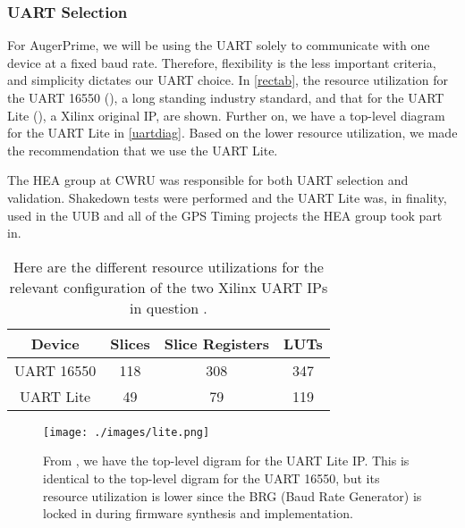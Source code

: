 \subsubsection{UART Selection}
For AugerPrime, we will be using the UART solely to communicate with one device at a fixed baud rate. Therefore, flexibility is the less important criteria, and simplicity dictates our UART choice. In \autoref{rectab}, the resource utilization for the UART 16550 (\cite{16550}), a long standing industry standard, and that for the UART Lite (\cite{lite}), a Xilinx original IP, are shown. Further on, we have a top-level diagram for the UART Lite in \autoref{uartdiag}. Based on the lower resource utilization, we made the recommendation that we use the UART Lite. 

The HEA group at CWRU was responsible for both UART selection and validation. Shakedown tests were performed and the UART Lite was, in finality, used in the UUB and all of the GPS Timing projects the HEA group took part in.
\begin{table}[h!]
\centering
\begin{tabular}{|c|c|c|c|} \hline
Device & Slices & Slice Registers & LUTs \\ \hline
UART 16550 & 118 & 308 & 347  \\ \hline
UART Lite & 49 & 79 &119  \\ \hline
\end{tabular}
\caption[FPGA UART Utilization Comparison]{Here are the different resource utilizations for the relevant configuration of the two Xilinx UART IPs in question \cite{lite, 16550}.}
\label{rectab}
\end{table}

\begin{figure}[h!]
\centering
\texttt{[image: ./images/lite.png]}
\caption[UART Lite Top-Level Diagram]{From \textcite{lite}, we have the top-level digram for the UART Lite IP. This is identical to the top-level digram for the UART 16550, but its resource utilization is lower since the BRG (Baud Rate Generator) is locked in during firmware synthesis and implementation.}
\label{uartdiag}
\end{figure}

